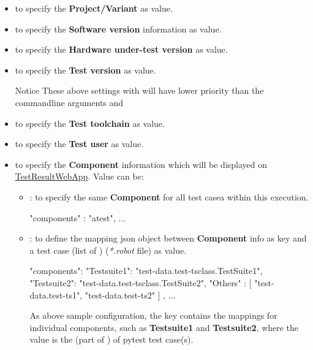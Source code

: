 \begin{itemize}
          \begin{itemize}
            \item {} to specify the \textbf{Project/Variant} as
                   value.
            \item {} to specify the \textbf{Software version}
                  information as  value.
            \item {} to specify the
                  \textbf{Hardware under-test version} as  value.
            \item {} to specify the \textbf{Test version} as
                   value.
            \begin{boxhint} {Notice}
              These above settings with  will have lower
              priority than the commandline arguments 
              and 
            \end{boxhint}
            \item {} to specify the \textbf{Test toolchain} as
                   value.
            \item {} to specify the \textbf{Test user} as
                   value.
            \item {} to specify the \textbf{Component}
                  information which will be displayed on
                  \href{https://github.com/test-fullautomation/testresultwebapp}
                  {TestResultWebApp}. Value can be:
              \begin{itemize}
                \item {}: to specify the same \textbf{Component}
                      for all test casea within this execution.
\begin{robotcode}
{
  "components" : "atest",
  ...
}
\end{robotcode}
                \item {}: to define the mapping json object between
                      \textbf{Component} info as key and a test case
                       (list of )
                      (\emph{*.robot} file) as value.
\begin{robotcode}
{
  "components": {
    "Testsuite1": "test-data.test-tsclass.TestSuite1",
    "Testsuite2": "test-data.test-tsclass.TestSuite2",
    "Others"    : [
        "test-data.test-ts1",
        "test-data.test-ts2"
    ]
  },
  ...
}
\end{robotcode}
                As above sample configuration, the  key
                contains the mappings for individual components, such as
                \textbf{Testsuite1} and \textbf{Testsuite2}, where the value
                is the  (part of ) of pytest
                test case(s).


\end{itemize}
\end{itemize}
\end{itemize}
